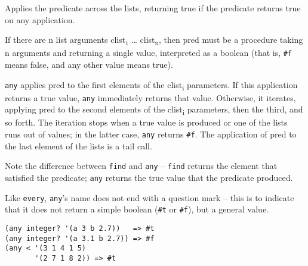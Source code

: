 \begin{entry}{%
  }

  Applies the predicate across the lists, returning true  if
  the predicate returns true on any application.

  If there are n list arguments clist$_1$ \ldots{}
  clist\textsubscript{n}, then pred must be a procedure taking n
  arguments and returning a single value, interpreted as a boolean
  (that is, \texttt{\#f} means false, and any other value means true).

  \texttt{any} applies pred to the first elements of the
  clist\textsubscript{i} parameters. If this application returns a
  true value, \texttt{any} immediately returns that value. Otherwise,
  it iterates, applying pred to the second elements of the
  clist\textsubscript{i} parameters, then the third, and so forth. The
  iteration stops when a true value is produced or one of the lists
  runs out of values; in the latter case, \texttt{any} returns
  \texttt{\#f}.  The application of pred to the last element of the
  lists is a tail call.

  Note the difference between \texttt{find} and \texttt{any} --
  \texttt{find} returns the element that satisfied the predicate;
  \texttt{any} returns the true value that the predicate produced.

  Like \texttt{every}, \texttt{any}'s name does not end with a
  question mark -- this is to indicate that it does not return a
  simple boolean (\texttt{\#t} or \texttt{\#f}), but a general value.

\begin{verbatim}
(any integer? '(a 3 b 2.7))   => #t
(any integer? '(a 3.1 b 2.7)) => #f
(any < '(3 1 4 1 5)
       '(2 7 1 8 2)) => #t
\end{verbatim}
\end{entry}

